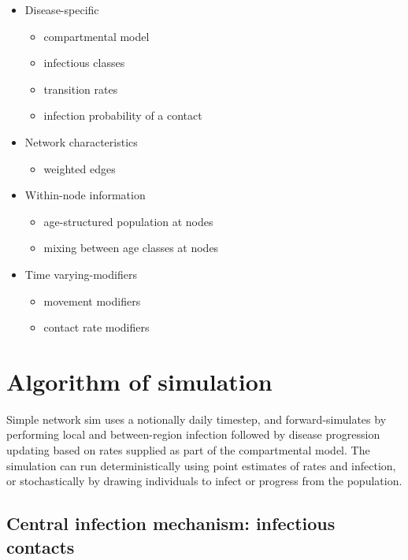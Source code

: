 \documentclass[11pt]{article}
\begin{document}
\begin{itemize}
\item Disease-specific
\begin{itemize}
\item compartmental model
\item infectious classes
\item transition rates
\item infection probability of a contact
\end{itemize}
\item Network characteristics
\begin{itemize}
\item weighted edges
\end{itemize}
\item Within-node information
\begin{itemize}
\item age-structured population at nodes
\item mixing between age classes at nodes
\end{itemize}
\item Time varying-modifiers
\begin{itemize}
\item movement modifiers
\item contact rate modifiers
\end{itemize}
\end{itemize}

\section{Algorithm of simulation}

Simple network sim uses a notionally daily timestep, and forward-simulates by performing local and between-region infection followed by disease progression updating based on rates supplied as part of the compartmental model.  The simulation can run deterministically using point estimates of rates and infection, or stochastically by drawing individuals to infect or progress from the population.  

\subsection{Central infection mechanism: infectious contacts }
\end{document}
